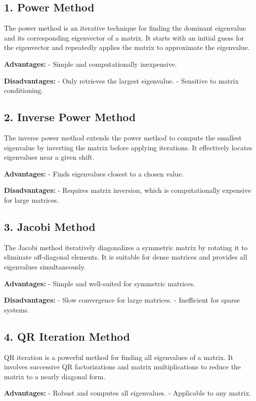 \documentclass[12pt,a4paper]{article}
\begin{document}
\subsection*{1. Power Method}
The power method is an iterative technique for finding the dominant eigenvalue and its corresponding eigenvector of a matrix. It starts with an initial guess for the eigenvector and repeatedly applies the matrix to approximate the eigenvalue.

\textbf{Advantages:}  
- Simple and computationally inexpensive.  

\textbf{Disadvantages:}  
- Only retrieves the largest eigenvalue.  
- Sensitive to matrix conditioning.

\subsection*{2. Inverse Power Method}
The inverse power method extends the power method to compute the smallest eigenvalue by inverting the matrix before applying iterations. It effectively locates eigenvalues near a given shift.

\textbf{Advantages:}  
- Finds eigenvalues closest to a chosen value.  

\textbf{Disadvantages:}  
- Requires matrix inversion, which is computationally expensive for large matrices.

\subsection*{3. Jacobi Method}
The Jacobi method iteratively diagonalizes a symmetric matrix by rotating it to eliminate off-diagonal elements. It is suitable for dense matrices and provides all eigenvalues simultaneously.

\textbf{Advantages:}  
- Simple and well-suited for symmetric matrices.  

\textbf{Disadvantages:}  
- Slow convergence for large matrices.  
- Inefficient for sparse systems.

\subsection*{4. QR Iteration Method}
QR iteration is a powerful method for finding all eigenvalues of a matrix. It involves successive QR factorizations and matrix multiplications to reduce the matrix to a nearly diagonal form.

\textbf{Advantages:}  
- Robust and computes all eigenvalues.  
- Applicable to any matrix.  
\end{document}
